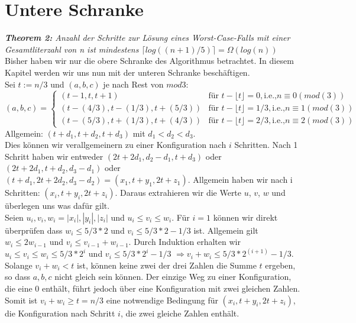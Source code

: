 \chapter{Untere Schranke} 
\textit{\textbf{Theorem 2:} Anzahl der Schritte zur Lösung eines Worst-Case-Falls mit einer Gesamtliterzahl von n ist mindestens $\lceil log ((n+1)/5) \rceil = \Omega (log(n))$} \\

Bisher haben wir nur die obere Schranke des Algorithmus betrachtet. In diesem Kapitel werden wir uns nun mit der unteren Schranke beschäftigen. \\

Sei $t:=n/3$ und $(a,b,c)$ je nach Rest von $mod 3$: 
\begin{equation}
    (a, b, c) = \begin{cases}
      (t-1, t, t+1) & \text{für } t-\lfloor t\rfloor = 0, \text{i.e.,} n \equiv 0 (mod (3))\\
      (t-(4/3), t-(1/3), t+(5/3)) & \text{für } t-\lfloor t\rfloor = 1/3, \text{i.e.,} n \equiv 1 (mod (3))\\
      (t-(5/3), t+(1/3), t+(4/3)) & \text{für } t-\lfloor t\rfloor = 2/3, \text{i.e.,} n \equiv 2 (mod (3))
    \end{cases}
 \end{equation}
Allgemein: $(t+d_1, t+d_2, t+d_3)$ mit $d_1<d_2<d_3$. \\

Dies können wir verallgemeinern zu einer Konfiguration nach $i$ Schritten. Nach 1 Schritt haben wir entweder $(2t+2d_1, d_2-d_1,t+d_3)$ oder $(2t+2d_1, t+d_2, d_3-d_1)$ oder $(t+d_1, 2t+2d_2,d_3-d_2)=(x_1, t+y_1, 2t+z_1)$.
Allgemein haben wir nach i Schritten: $(x_i, t+y_i, 2t+z_i)$. Daraus extrahieren wir die Werte $u$, $v$, $w$ und überlegen uns was dafür gilt. \\ 
Seien ${u_i, v_i, w_i }={|x_i |, |y_i |, |z_i |}$ und $u_i\leq v_i\leq w_i$. 
Für $i=1$ können wir direkt überprüfen dass $w_i\leq 5/3*2$ und $v_i\leq 5/3*2 -1/3$ ist. Allgemein gilt $w_i \leq 2w_{i-1}$ und $v_i\leq v_{i-1}+w_{i-1}$. Durch Induktion erhalten wir $u_i\leq v_i\leq w_i\leq 5/3*2^i$ und $v_i\leq 5/3*2^i  -1/3$ $\Rightarrow v_i+w_i\leq 5/3*2^(i+1) -1/3$. \\

Solange $v_i+w_i<t$ ist, können keine zwei der drei Zahlen die Summe $t$ ergeben, so dass $a, b, c$ nicht gleich sein können. Der einzige Weg zu einer Konfiguration, die eine $0$ enthält, führt jedoch über eine Konfiguration mit zwei gleichen Zahlen. Somit ist $v_i+w_i \geq t=n/3$ eine notwendige Bedingung für $(x_i, t+y_i, 2t+z_i)$, die Konfiguration nach Schritt $i$, die zwei gleiche Zahlen enthält. \\ 

